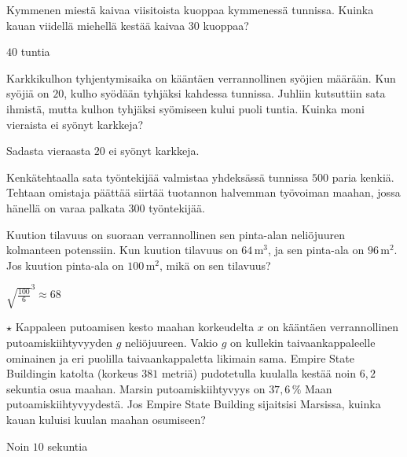 \begin{tehtavasivu}
\begin{tehtava}
	Kymmenen miestä kaivaa viisitoista kuoppaa kymmenessä tunnissa. Kuinka kauan viidellä miehellä kestää kaivaa $30$ kuoppaa?	
	\begin{vastaus}
		$40$ tuntia
	\end{vastaus}
\end{tehtava}


\begin{tehtava}
	Karkkikulhon tyhjentymisaika on kääntäen verrannollinen syöjien määrään. Kun syöjiä on $20$, kulho syödään tyhjäksi kahdessa tunnissa. Juhliin kutsuttiin sata ihmistä, mutta kulhon tyhjäksi syömiseen kului puoli tuntia. Kuinka moni vieraista ei syönyt karkkeja?
	\begin{vastaus}
		Sadasta vieraasta $20$ ei syönyt karkkeja.
	\end{vastaus}
\end{tehtava}

\begin{tehtava}
Kenkätehtaalla sata työntekijää valmistaa yhdeksässä tunnissa $500$ paria kenkiä. Tehtaan omistaja päättää siirtää tuotannon halvemman työvoiman maahan, jossa hänellä on varaa palkata $300$ työntekijää. 

\begin{vastaus}
\end{vastaus}
\end{tehtava}

\begin{tehtava}
	Kuution tilavuus on suoraan verrannollinen sen pinta-alan neliöjuuren kolmanteen potenssiin. Kun kuution tilavuus on $64$\,m$^3$, ja sen pinta-ala on $96$\,m$^2$. Jos kuution pinta-ala on $100$\,m$^2$, mikä on sen tilavuus?
	\begin{vastaus}
		${\sqrt{\frac{100}{6}}}^{3} \approx 68$
	\end{vastaus}
\end{tehtava}

\begin{tehtava} $\star$ Kappaleen putoamisen kesto maahan korkeudelta $x$ on kääntäen verrannollinen putoamiskiihtyvyyden $g$ neliöjuureen. Vakio $g$ on kullekin taivaankappaleelle ominainen ja eri puolilla taivaankappaletta likimain sama. Empire State Buildingin katolta (korkeus $381$ metriä) pudotetulla kuulalla kestää noin $6,2$ sekuntia osua maahan. Marsin putoamiskiihtyvyys on $37,6\,\%$ Maan putoamiskiihtyvyydestä. Jos Empire State Building sijaitsisi Marsissa, kuinka kauan kuluisi kuulan maahan osumiseen?
    \begin{vastaus}
        Noin $10$ sekuntia
    \end{vastaus}
\end{tehtava}

\end{tehtavasivu}
